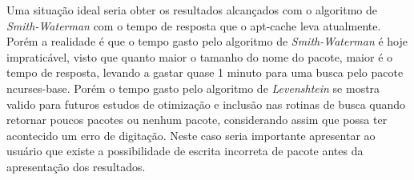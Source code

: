 Uma situação ideal seria obter os resultados alcançados com o algoritmo de \textit{Smith-Waterman} com o tempo de resposta que o {\code apt-cache} leva atualmente. Porém a realidade é que o tempo gasto pelo algoritmo de \textit{Smith-Waterman} é hoje impraticável, visto que quanto maior o tamanho do nome do pacote, maior é o tempo de resposta, levando a gastar quase 1 minuto para uma busca pelo pacote {\code ncurses-base}. Porém o tempo gasto pelo algoritmo de 
\textit{Levenshtein} se mostra valido para futuros estudos de otimização e inclusão nas rotinas de busca quando retornar poucos pacotes ou nenhum pacote, considerando assim que possa ter acontecido um erro de digitação. Neste caso seria importante apresentar ao usuário que existe a possibilidade de escrita incorreta de pacote antes da apresentação dos resultados.
